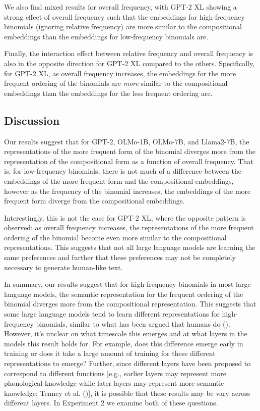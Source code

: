 \documentclass[
  12pt,
  letterpaper,
]{scrreport}
\begin{document}
We also find mixed results for overall frequency, with GPT-2 XL showing
a strong effect of overall frequency such that the embeddings for
high-frequency binomials (ignoring relative frequency) are more similar
to the compositional embeddings than the embeddings for low-frequency
binomials are.

Finally, the interaction effect between relative frequency and overall
frequency is also in the opposite direction for GPT-2 XL compared to the
others. Specifically, for GPT-2 XL, as overall frequency increases, the
embeddings for the more frequent ordering of the binomials are
\emph{more} similar to the compositional embeddings than the embeddings
for the less frequent ordering are.

\subsection{Discussion}\label{discussion-8}

Our results suggest that for GPT-2, OLMo-1B, OLMo-7B, and Llama2-7B, the
representations of the more frequent form of the binomial diverges more
from the representation of the compositional form as a function of
overall frequency. That is, for low-frequency binomials, there is not
much of a difference between the embeddings of the more frequent form
and the compositional embeddings, however as the frequency of the
binomial increases, the embeddings of the more frequent form diverge
from the compositional embeddings.

Interestingly, this is not the case for GPT-2 XL, where the opposite
pattern is observed: as overall frequency increases, the representations
of the more frequent ordering of the binomial become even more similar
to the compositional representations. This suggests that not all large
language models are learning the same preferences and further that these
preferences may not be completely necessary to generate human-like text.

In summary, our results suggest that for high-frequency binomials in
most large language models, the semantic representation for the frequent
ordering of the binomial diverges more from the compositional
representation. This suggests that some large language models tend to
learn different representations for high-frequency binomials, similar to
what has been argued that humans do
(). However, it's unclear on what timescale this emerges and at
what layers in the models this result holds for. For example, does this
difference emerge early in training or does it take a large amount of
training for these different representations to emerge? Further, since
different layers have been proposed to correspond to different functions
{[}e.g., earlier layers may represent more phonological knowledge while
later layers may represent more semantic knowledge; Tenney et al.
(){]}, it is
possible that these results may be vary across different layers. In
Experiment 2 we examine both of these questions.
\end{document}
